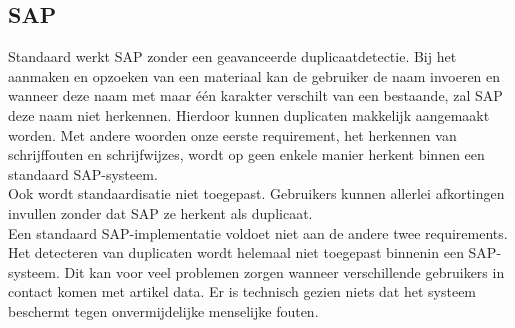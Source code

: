 \subsection{SAP}
Standaard werkt SAP zonder een geavanceerde duplicaatdetectie. Bij het aanmaken en opzoeken van een materiaal kan de gebruiker de naam invoeren en wanneer deze naam met maar één karakter verschilt van een bestaande, zal SAP deze naam niet herkennen. Hierdoor kunnen duplicaten makkelijk aangemaakt worden. Met andere woorden onze eerste requirement, het herkennen van schrijffouten en schrijfwijzes, wordt op geen enkele manier herkent binnen een standaard SAP-systeem.
\\Ook wordt standaardisatie niet toegepast. Gebruikers kunnen allerlei afkortingen invullen zonder dat SAP ze herkent als duplicaat. 
\\Een standaard SAP-implementatie voldoet niet aan de andere twee requirements. Het detecteren van duplicaten wordt helemaal niet toegepast binnenin een SAP-systeem. Dit kan voor veel problemen zorgen wanneer verschillende gebruikers in contact komen met artikel data. Er is technisch gezien niets dat het systeem beschermt tegen onvermijdelijke menselijke fouten.

